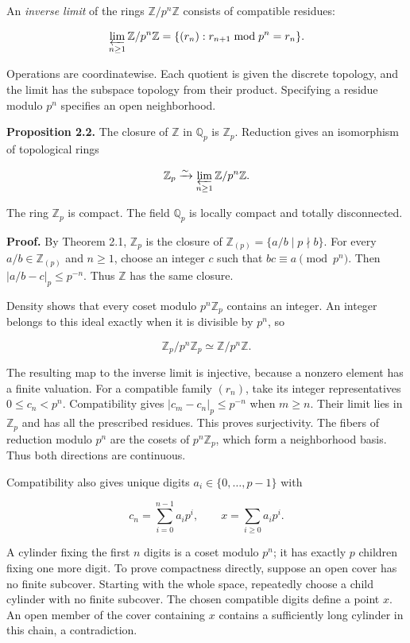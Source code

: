 \documentclass[
  english,
  11pt,
  a4paper,
]{article}
\begin{document}
An \emph{inverse limit} of the rings \(\mathbb Z/p^n\mathbb Z\) consists
of compatible residues:

\[\varprojlim_{n\ge1}\mathbb Z/p^n\mathbb Z
=\{(r_n):r_{n+1}\bmod p^n=r_n\}.\]

Operations are coordinatewise. Each quotient is given the discrete
topology, and the limit has the subspace topology from their product.
Specifying a residue modulo \(p^n\) specifies an open neighborhood.

\textbf{Proposition 2.2.} The closure of \(\mathbb Z\) in
\(\mathbb Q_p\) is \(\mathbb Z_p\). Reduction gives an isomorphism of
topological rings

\[\mathbb Z_p\xrightarrow{\sim}
\varprojlim_{n\ge1}\mathbb Z/p^n\mathbb Z.\]

The ring \(\mathbb Z_p\) is compact. The field \(\mathbb Q_p\) is
locally compact and totally disconnected.

\textbf{Proof.} By Theorem 2.1, \(\mathbb Z_p\) is the closure of
\(\mathbb Z_{(p)}=\{a/b\mid p\nmid b\}\). For every
\(a/b\in\mathbb Z_{(p)}\) and \(n\ge1\), choose an integer \(c\) such
that \(bc\equiv a\pmod{p^n}\). Then \(|a/b-c|_p\le p^{-n}\). Thus
\(\mathbb Z\) has the same closure.

Density shows that every coset modulo \(p^n\mathbb Z_p\) contains an
integer. An integer belongs to this ideal exactly when it is divisible
by \(p^n\), so

\[\mathbb Z_p/p^n\mathbb Z_p\simeq\mathbb Z/p^n\mathbb Z.\]

The resulting map to the inverse limit is injective, because a nonzero
element has a finite valuation. For a compatible family \((r_n)\), take
its integer representatives \(0\le c_n<p^n\). Compatibility gives
\(|c_m-c_n|_p\le p^{-n}\) when \(m\ge n\). Their limit lies in
\(\mathbb Z_p\) and has all the prescribed residues. This proves
surjectivity. The fibers of reduction modulo \(p^n\) are the cosets of
\(p^n\mathbb Z_p\), which form a neighborhood basis. Thus both
directions are continuous.

Compatibility also gives unique digits \(a_i\in\{0,\ldots,p-1\}\) with

\[c_n=\sum_{i=0}^{n-1}a_ip^i,
\qquad x=\sum_{i\ge0}a_ip^i.\]

A cylinder fixing the first \(n\) digits is a coset modulo \(p^n\); it
has exactly \(p\) children fixing one more digit. To prove compactness
directly, suppose an open cover has no finite subcover. Starting with
the whole space, repeatedly choose a child cylinder with no finite
subcover. The chosen compatible digits define a point \(x\). An open
member of the cover containing \(x\) contains a sufficiently long
cylinder in this chain, a contradiction.
\end{document}

